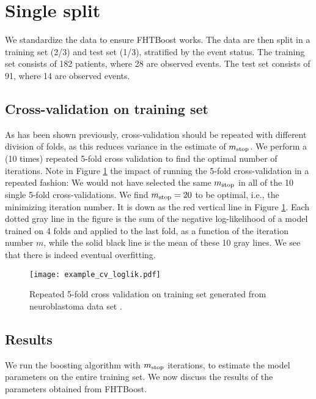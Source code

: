 \section{Single split}
We standardize the data to ensure FHTBoost works.
The data are then split in a training set (2/3) and test set (1/3), stratified by the event status.
The training set consists of 182 patients, where 28 are observed events.
The test set consists of 91, where 14 are observed events.

\subsection{Cross-validation on training set}
As has been shown previously, cross-validation should be repeated with different division of folds, as this reduces variance in the estimate of $m_{\text{stop}}$.
We perform a (10 times) repeated 5-fold cross validation to find the optimal number of iterations.
Note in Figure \ref{fig:neuroblastoma-cv} the impact of running the 5-fold cross-validation in a repeated fashion:
We would not have selected the same $m_{\text{stop}}$ in all of the 10 single 5-fold cross-validations.
We find $m_{\text{stop}}=20$ to be optimal, i.e., the minimizing iteration number.
It is down as the red vertical line in Figure \ref{fig:neuroblastoma-cv}.
Each dotted gray line in the figure is the sum of the negative log-likelihood of a model trained on 4 folds and applied to the last fold, as a function of the iteration number $m$, while the solid black line is the mean of these 10 gray lines.
We see that there is indeed eventual overfitting.

\begin{figure}
\caption{Repeated 5-fold cross validation on training set generated from neuroblastoma data set \citep{oberthuer-data}.}
\label{fig:neuroblastoma-cv}
\centering\texttt{[image: example\_cv\_loglik.pdf]}
\end{figure}

\subsection{Results}
We run the boosting algorithm with $m_{\text{stop}}$ iterations, to estimate the model parameters on the entire training set.
We now discuss the results of the parameters obtained from FHTBoost.

